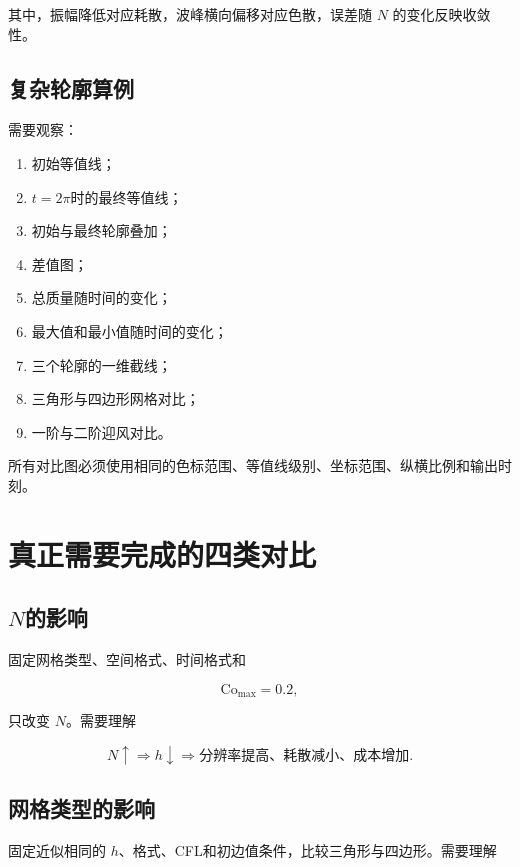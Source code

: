 \documentclass[UTF8,12pt,a4paper,fontset=fandol]{ctexart}
\newcommand{\Cmax}{\mathrm{Co}_{\max}}
\begin{document}
其中，振幅降低对应耗散，波峰横向偏移对应色散，误差随 $N$ 的变化反映收敛性。

\subsection{复杂轮廓算例}

需要观察：

\begin{enumerate}
  \item 初始等值线；
  \item $t=2\pi$时的最终等值线；
  \item 初始与最终轮廓叠加；
  \item 差值图；
  \item 总质量随时间的变化；
  \item 最大值和最小值随时间的变化；
  \item 三个轮廓的一维截线；
  \item 三角形与四边形网格对比；
  \item 一阶与二阶迎风对比。
\end{enumerate}

所有对比图必须使用相同的色标范围、等值线级别、坐标范围、纵横比例和输出时刻。

\section{真正需要完成的四类对比}

\subsection{\texorpdfstring{$N$}{N}的影响}

固定网格类型、空间格式、时间格式和

\begin{equation}
\Cmax=0.2,
\end{equation}

只改变 $N$。需要理解

\begin{equation}
N\uparrow
\Longrightarrow
h\downarrow
\Longrightarrow
\text{分辨率提高、耗散减小、成本增加}.
\end{equation}

\subsection{网格类型的影响}

固定近似相同的 $h$、格式、CFL和初边值条件，比较三角形与四边形。需要理解
\end{document}
